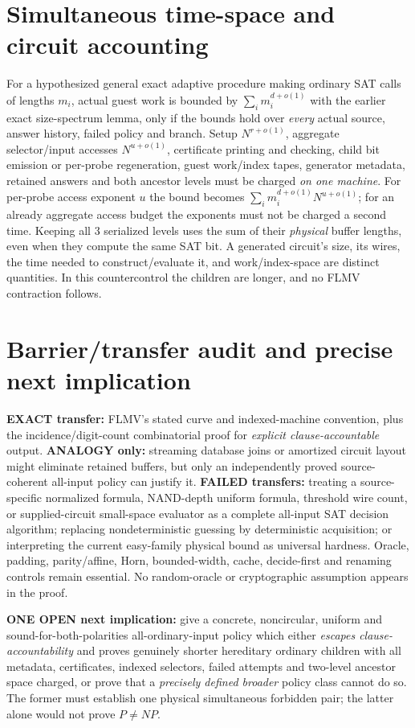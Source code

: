 \documentclass[11pt]{article}
\begin{document}
\section{Simultaneous time-space and circuit accounting}
For a hypothesized general exact adaptive procedure making ordinary SAT calls of lengths $m_i$, actual guest work is bounded by $\sum_i m_i^{d+o(1)}$ with the earlier exact size-spectrum lemma, only if the bounds hold over \emph{every} actual source, answer history, failed policy and branch. Setup $N^{r+o(1)}$, aggregate selector/input accesses $N^{u+o(1)}$, certificate printing and checking, child bit emission or per-probe regeneration, guest work/index tapes, generator metadata, retained answers and both ancestor levels must be charged \emph{on one machine}. For per-probe access exponent $u$ the bound becomes $\sum_i m_i^{d+o(1)} N^{u+o(1)}$; for an already aggregate access budget the exponents must not be charged a second time. Keeping all 3 serialized levels uses the sum of their \emph{physical} buffer lengths, even when they compute the same SAT bit. A generated circuit's size, its wires, the time needed to construct/evaluate it, and work/index-space are distinct quantities. In this countercontrol the children are longer, and no FLMV contraction follows.

\section{Barrier/transfer audit and precise next implication}
\textbf{EXACT transfer:} FLMV's stated curve and indexed-machine convention, plus the incidence/digit-count combinatorial proof for \emph{explicit clause-accountable} output. \textbf{ANALOGY only:} streaming database joins or amortized circuit layout might eliminate retained buffers, but only an independently proved source-coherent all-input policy can justify it. \textbf{FAILED transfers:} treating a source-specific normalized formula, NAND-depth uniform formula, threshold wire count, or supplied-circuit small-space evaluator as a complete all-input SAT decision algorithm; replacing nondeterministic guessing by deterministic acquisition; or interpreting the current easy-family physical bound as universal hardness. Oracle, padding, parity/affine, Horn, bounded-width, cache, decide-first and renaming controls remain essential. No random-oracle or cryptographic assumption appears in the proof.

\textbf{ONE OPEN next implication:} give a concrete, noncircular, uniform and sound-for-both-polarities all-ordinary-input policy which either \emph{escapes clause-accountability} and proves genuinely shorter hereditary ordinary children with all metadata, certificates, indexed selectors, failed attempts and two-level ancestor space charged, or prove that a \emph{precisely defined broader} policy class cannot do so. The former must establish one physical simultaneous forbidden pair; the latter alone would not prove $P\ne NP$.
\end{document}

